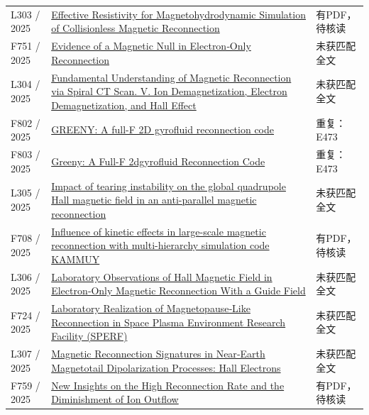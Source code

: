 \documentclass[UTF8,a4paper,11pt,openany,fontset=fandol]{ctexbook}
\begin{document}
\begin{longtable}{P{24mm}P{97mm}P{27mm}}
L303 / 2025 & \href{https://doi.org/10.1029/2025ja034289}{Effective Resistivity for Magnetohydrodynamic Simulation of Collisionless Magnetic Reconnection} & 有PDF，待核读\\

F751 / 2025 & \href{https://doi.org/10.1029/2024gl113104}{Evidence of a Magnetic Null in Electron‐Only Reconnection} & 未获匹配全文\\

L304 / 2025 & \href{https://doi.org/10.3847/1538-4357/ae0ffc}{Fundamental Understanding of Magnetic Reconnection via Spiral CT Scan. V. Ion Demagnetization,  Electron Demagnetization,  and Hall Effect} & 未获匹配全文\\

F802 / 2025 & \href{https://doi.org/10.1016/j.cpc.2025.109807}{GREENY: A full-F 2D gyrofluid reconnection code} & 重复：E473\\

F803 / 2025 & \href{https://doi.org/10.2139/ssrn.5201132}{Greeny: A Full-F 2dgyrofluid Reconnection Code} & 重复：E473\\

L305 / 2025 & \href{https://doi.org/10.1063/5.0259029}{Impact of tearing instability on the global quadrupole Hall magnetic field in an anti-parallel magnetic reconnection} & 未获匹配全文\\

F708 / 2025 & \href{https://doi.org/10.1093/pasj/psaf123}{Influence of kinetic effects in large-scale magnetic reconnection with multi-hierarchy simulation code KAMMUY} & 有PDF，待核读\\

L306 / 2025 & \href{https://doi.org/10.1029/2024gl114151}{Laboratory Observations of Hall Magnetic Field in Electron‐Only Magnetic Reconnection With a Guide Field} & 未获匹配全文\\

F724 / 2025 & \href{https://doi.org/10.1029/2025gl117351}{Laboratory Realization of Magnetopause‐Like Reconnection in Space Plasma Environment Research Facility (SPERF)} & 未获匹配全文\\

L307 / 2025 & \href{https://doi.org/10.1029/2025ja033875}{Magnetic Reconnection Signatures in Near‐Earth Magnetotail Dipolarization Processes: Hall Electrons} & 未获匹配全文\\

F759 / 2025 & \href{https://doi.org/10.1029/2024gl113889}{New Insights on the High Reconnection Rate and the Diminishment of Ion Outflow} & 有PDF，待核读\\


\end{longtable}
\end{document}
